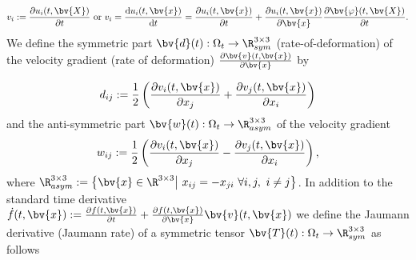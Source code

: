 \begin{equation}
v_i:=\frac{\partial u_i(t,\bv{X})}{\partial t}\mbox{ or  }v_i=\frac{\mathrm{d} u_i(t,\bv{x})}{\mathrm{d} t}=\frac{\partial u_i(t,\bv{x})}{ \partial t}+\frac{\partial u_i(t,\bv{x})}{ \partial \bv{x}} \frac{\partial \bv{\varphi}(t,\bv{X})}{ \partial t}.
\end{equation}
We define the symmetric part $\bv{d}(t):\Omega_t\rightarrow \R^{3\times 3}_{sym}$ (rate-of-deformation) of the velocity gradient (rate of deformation) $\frac{\partial \bv{v}(t,\bv{x})}{\partial \bv{x}}$ by

\begin{equation}\label{eq:RateOfDeformation}
d_{ij}:=\frac{1}{2}\left( \frac{\partial v_i(t,\bv{x})}{\partial x_j}+\frac{\partial v_j(t,\bv{x})}{\partial x_i}\right)
\end{equation}
and the anti-symmetric part $\bv{w}(t):\Omega_t\rightarrow \R^{3\times 3}_{asym}$ of the velocity gradient
\begin{equation}
w_{ij}:=\frac{1}{2}\left( \frac{\partial v_i(t,\bv{x})}{\partial x_j}-\frac{\partial v_j(t,\bv{x})}{\partial x_i}\right),
\end{equation}
where $\R^{3\times 3}_{asym}:=\left\lbrace \bv{x}\in \R^{3\times 3}\middle|~x_{ij}=-x_{ji}~ \forall i,j,~i\neq j \right\rbrace$. In addition to the standard time derivative $\dot{f}(t,\bv{x}):=\frac{\partial f(t,\bv{x})}{\partial t}+\frac{\partial f(t,\bv{x})}{\partial \bv{x}}\bv{v}(t,\bv{x})$ we define the Jaumann derivative (Jaumann rate) of a symmetric tensor $\bv{T}(t):\Omega_t\rightarrow \R^{3\times 3}_{sym}$ as follows

